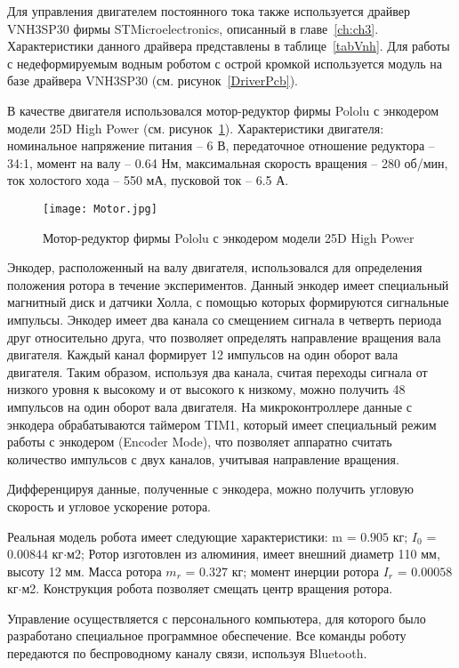 Для управления двигателем постоянного тока также используется драйвер VNH3SP30 фирмы STMicroelectronics, описанный в главе~\ref{ch:ch3}. Характеристики данного драйвера представлены в таблице~\ref{tabVnh}. Для работы с недеформируемым водным роботом с острой кромкой используется модуль на базе драйвера VNH3SP30 (см. рисунок~\ref{DriverPcb}). 


В качестве двигателя использовался мотор-редуктор фирмы Pololu с энкодером модели 25D High Power (см. рисунок~\ref{Motor}). Характеристики двигателя: номинальное напряжение питания -- 6 В, передаточное отношение редуктора -- 34:1, момент на валу -- 0.64 Нм, максимальная скорость вращения -- 280 об/мин, ток холостого хода -- 550 мА, пусковой ток -- 6.5 А. 

\begin{figure}[h]
	\centering
	\texttt{[image: Motor.jpg]}%
	\caption{Мотор-редуктор фирмы Pololu с энкодером модели 25D High Power}
	\label{Motor}
\end{figure}


Энкодер, расположенный на валу двигателя, использовался для определения положения ротора в течение экспериментов. Данный энкодер имеет специальный магнитный диск и датчики Холла, с помощью которых формируются сигнальные импульсы. Энкодер имеет два канала со смещением сигнала в четверть периода друг относительно друга, что позволяет определять направление вращения вала двигателя. Каждый канал формирует 12 импульсов на один оборот вала двигателя. Таким образом, используя два канала, считая переходы сигнала от низкого уровня к высокому и от высокого к низкому, можно получить 48 импульсов на один оборот вала двигателя. На микроконтроллере данные с энкодера обрабатываются таймером TIM1, который имеет специальный режим работы с энкодером (Encoder Mode), что позволяет аппаратно считать количество импульсов с двух каналов, учитывая направление вращения. 

Дифференцируя данные, полученные с энкодера, можно получить угловую скорость и угловое ускорение ротора.






Реальная модель робота имеет следующие характеристики: m = $0.905$ кг; $I_0$ = $0.00844$ кг$\cdot$м2; Ротор изготовлен из алюминия, имеет внешний диаметр 110 мм, высоту 12 мм. Масса ротора $m_r$ = $0.327$ кг; момент инерции ротора $I_r$ = $0.00058$ кг$\cdot$м2. Конструкция робота позволяет смещать центр вращения ротора.

Управление осуществляется с персонального компьютера, для которого было разработано специальное программное обеспечение. Все команды роботу передаются по беспроводному каналу связи, используя Bluetooth.


